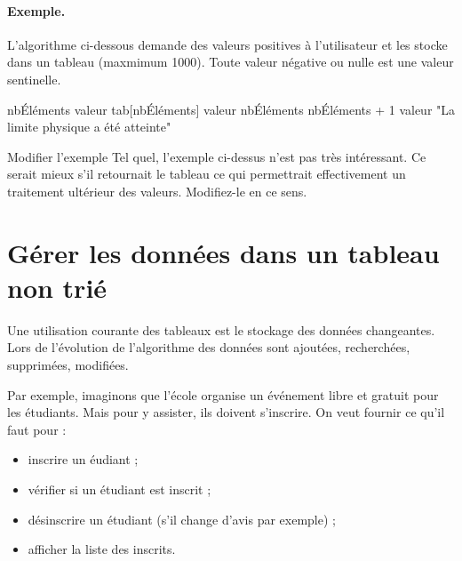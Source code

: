 		\paragraph{Exemple.}
		L'algorithme ci-dessous 
		demande des valeurs positives à l'utilisateur 
		et les stocke dans un tableau (maxmimum 1000).
		Toute valeur négative ou nulle est une valeur sentinelle.
		\begin{LDA}
				 
				\Let nbÉléments 
				\Read valeur
					\Let tab[nbÉléments] \Gets valeur
					\Let nbÉléments \Gets nbÉléments + 1
					\Read valeur
				\EndWhile
						
					\Write "La limite physique a été atteinte"
				\EndIf
			\EndAlgo
		\end{LDA}

		\begin{Exercice}{Modifier l'exemple}
			Tel quel, l'exemple ci-dessus n'est pas très intéressant.
			Ce serait mieux s'il retournait le tableau 
			ce qui permettrait effectivement un traitement ultérieur
			des valeurs.
			Modifiez-le en ce sens.
		\end{Exercice}
		
	\section{Gérer les données dans un tableau non trié} 
		
		Une utilisation courante des tableaux
		est le stockage des données changeantes.
		Lors de l'évolution de l'algorithme
		des données sont ajoutées, recherchées, supprimées, modifiées.
		
		Par exemple, imaginons que l'école 
		organise un événement libre et gratuit pour les étudiants.
		Mais pour y assister, ils doivent s'inscrire.
		On veut fournir ce qu'il faut pour :
		\begin{itemize}
		\item inscrire un éudiant ;
		\item vérifier si un étudiant est inscrit ;
		\item désinscrire un étudiant (s'il change d'avis par exemple) ;
		\item afficher la liste des inscrits.
		\end{itemize}

